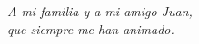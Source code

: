 \begin{dedicatoria}
  \itshape
  A mi familia y a mi amigo Juan,\\
  que siempre me han animado.
\end{dedicatoria}
